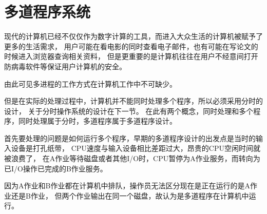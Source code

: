 \section{多道程序系统}

现代的计算机已经不仅仅作为数字计算的工具，而进入大众生活的计算机被赋予了更多的生活需求，
用户可能在看电影的同时查看电子邮件，也有可能在写论文的时候进入浏览器查询相关资料，
但是更重要的是计算机往往在用户不经意间打开防病毒软件等保证用户计算机的安全\cite{tanenbaum2009modern}。

由此可见多进程的工作方式在计算机工作中不可缺少。

但是在实际的处理过程中，计算机并不能同时处理多个程序，所以必须采用分时的设计，
关于分时操作系统的设计在下一节。
在此有两个概念，同时处理和多个程序，同时处理属于分时，多道程序属于多道程序设计。

首先要处理的问题是如何运行多个程序，早期的多道程序设计的出发点是当时的输入设备是打孔纸带，
CPU速度与输入设备相比差距过大，昂贵的CPU空闲时间就被浪费了，
在A作业等待磁盘或者其他I/O时，CPU暂停为A作业服务，而转向为已I/O操作已完成的B作业服务。

因为A作业和B作业都在计算机中排队，操作员无法区分现在是正在运行的是A作业还是B作业，
但两个作业输出在同一个磁盘，故认为是多道程序在计算机中运行。

